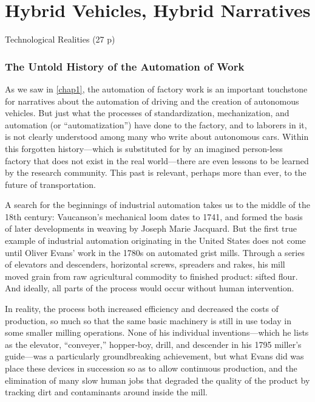 \chapter{Hybrid Vehicles, Hybrid Narratives}

Technological Realities (27 p)




\subsection{The Untold History of the Automation of Work}

As we saw in \ref{chap1}, the automation of factory work is an
important touchstone for narratives about the automation of driving
and the creation of autonomous vehicles. But just what the
processes of standardization, mechanization, and automation (or
``automatization'') have done to the factory, and to laborers in it, is
not clearly understood among many who write about autonomous cars. Within this
forgotten history---which is substituted for by an imagined person-less
factory that does not exist in the real world---there are even lessons to be
learned by the research community. This past is relevant, perhaps
more than ever, to the future of transportation.

A search for the beginnings of industrial automation takes us to the middle of
the 18th century: Vaucanson's mechanical loom dates to 1741, and formed the basis of
 later developments in weaving by Joseph Marie Jacquard.\cite[p. 9]{dieboldImpact} 
But the first true example of industrial automation originating in the
United States does not come until Oliver Evans' work in the 1780s on
automated grist mills.\cite[p. 5]{roesmithYankee} Through a series of elevators and descenders,
horizontal screws, spreaders and rakes, his mill moved grain from raw
agricultural commodity to finished product: sifted flour. And ideally,
all parts of the process would occur without human intervention. 

In reality, the process both increased efficiency and decreased the costs
of production, so much so that the same basic machinery is still in
use today in some smaller milling operations.\cite{wyegrist} None of his individual
inventions---which he lists as the elevator, ``conveyer,'' hopper-boy,
drill, and descender in his 1795 miller's guide---was a particularly
groundbreaking achievement, but what Evans did was place these devices
in succession so as to allow continuous production, and the
elimination of many slow human jobs that degraded the quality of the
product by tracking dirt and contaminants around inside the
mill.\cite[p. 203]{evansMillguide} 

